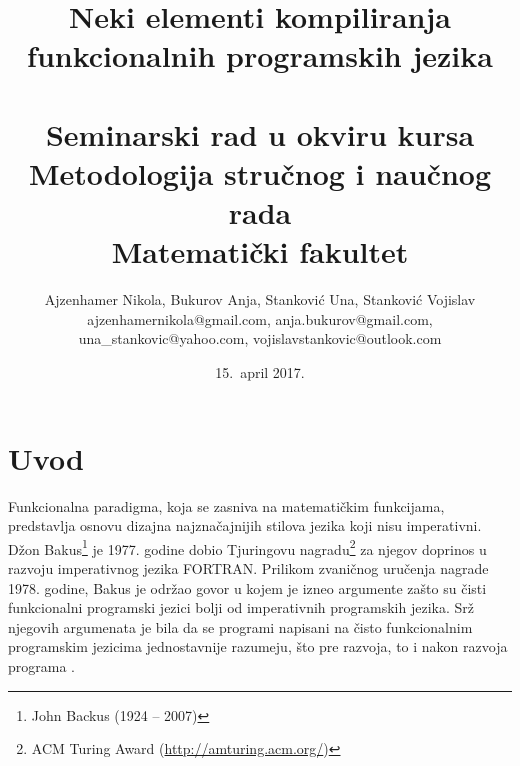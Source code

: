 \documentclass[a4paper]{article}
\begin{document}
\title{Neki elementi kompiliranja funkcionalnih programskih jezika\\ \small{~\\Seminarski rad u okviru kursa\\Metodologija stručnog i naučnog rada\\ Matematički fakultet}}

\author{
	Ajzenhamer Nikola, Bukurov Anja, Stanković Una, Stanković Vojislav\\
	ajzenhamernikola@gmail.com, anja.bukurov@gmail.com,\\
	una\_stankovic@yahoo.com, vojislavstankovic@outlook.com
	}
\date{15.~april 2017.}
\maketitle


\tableofcontents

\newpage

\section{Uvod}
\label{sec:uvod}


Funkcionalna paradigma, koja se zasniva na matematičkim funkcijama, predstavlja osnovu dizajna najznačajnijih stilova jezika koji nisu imperativni. Džon Bakus\footnote{John Backus (1924 -- 2007)} je 1977. godine dobio Tjuringovu nagradu\footnote{ACM Turing Award (\url{http://amturing.acm.org/})} za njegov doprinos u razvoju imperativnog jezika FORTRAN. Prilikom zvaničnog uručenja nagrade 1978. godine, Bakus je održao govor u kojem je izneo argumente zašto su čisti funkcionalni programski jezici bolji od imperativnih programskih jezika. Srž njegovih argumenata je bila da se programi napisani na čisto funkcionalnim programskim jezicima jednostavnije razumeju, što pre razvoja, to i nakon razvoja programa \cite{Can-Programming-Be-Liberated-from-the-von-Neumann-Style?, Concepts-of-Programming-Languages}.
\end{document}
